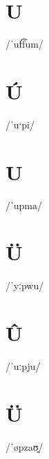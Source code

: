 \documentclass[10pt,a4paper,twoside]{book}
\begin{document}
\section*{U}

\begin{multicols}{3}
 {/ˈuf͡fum/} {}
\end{multicols}

\section*{Ú}

\begin{multicols}{3}
 {/ˈuˑpi/} {}
\end{multicols}

\section*{U}

\begin{multicols}{3}
 {/ˈupma/} {}
\end{multicols}

\section*{Ü}

\begin{multicols}{3}
 {/ˈyːpwu/} {}
\end{multicols}

\section*{Û}

\begin{multicols}{3}
 {/ˈuːpju/} {}
\end{multicols}

\section*{Ü}

\begin{multicols}{3}
 {/ˈøpzaʊ̯/} {}
\end{multicols}
\end{document}
